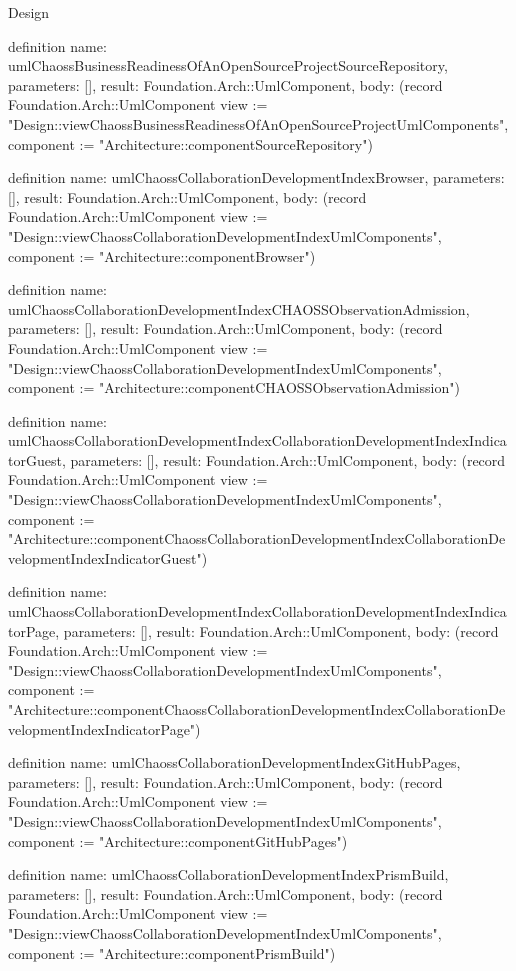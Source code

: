 \begin{lexlean}{Design}
\begin{semanticmodule}
definition{
  name: umlChaossBusinessReadinessOfAnOpenSourceProjectSourceRepository,
  parameters: [],
  result: Foundation.Arch::UmlComponent,
  body: (record Foundation.Arch::UmlComponent {view := "Design::viewChaossBusinessReadinessOfAnOpenSourceProjectUmlComponents", component := "Architecture::componentSourceRepository"})
}

definition{
  name: umlChaossCollaborationDevelopmentIndexBrowser,
  parameters: [],
  result: Foundation.Arch::UmlComponent,
  body: (record Foundation.Arch::UmlComponent {view := "Design::viewChaossCollaborationDevelopmentIndexUmlComponents", component := "Architecture::componentBrowser"})
}

definition{
  name: umlChaossCollaborationDevelopmentIndexCHAOSSObservationAdmission,
  parameters: [],
  result: Foundation.Arch::UmlComponent,
  body: (record Foundation.Arch::UmlComponent {view := "Design::viewChaossCollaborationDevelopmentIndexUmlComponents", component := "Architecture::componentCHAOSSObservationAdmission"})
}

definition{
  name: umlChaossCollaborationDevelopmentIndexCollaborationDevelopmentIndexIndicatorGuest,
  parameters: [],
  result: Foundation.Arch::UmlComponent,
  body: (record Foundation.Arch::UmlComponent {view := "Design::viewChaossCollaborationDevelopmentIndexUmlComponents", component := "Architecture::componentChaossCollaborationDevelopmentIndexCollaborationDevelopmentIndexIndicatorGuest"})
}

definition{
  name: umlChaossCollaborationDevelopmentIndexCollaborationDevelopmentIndexIndicatorPage,
  parameters: [],
  result: Foundation.Arch::UmlComponent,
  body: (record Foundation.Arch::UmlComponent {view := "Design::viewChaossCollaborationDevelopmentIndexUmlComponents", component := "Architecture::componentChaossCollaborationDevelopmentIndexCollaborationDevelopmentIndexIndicatorPage"})
}

definition{
  name: umlChaossCollaborationDevelopmentIndexGitHubPages,
  parameters: [],
  result: Foundation.Arch::UmlComponent,
  body: (record Foundation.Arch::UmlComponent {view := "Design::viewChaossCollaborationDevelopmentIndexUmlComponents", component := "Architecture::componentGitHubPages"})
}

definition{
  name: umlChaossCollaborationDevelopmentIndexPrismBuild,
  parameters: [],
  result: Foundation.Arch::UmlComponent,
  body: (record Foundation.Arch::UmlComponent {view := "Design::viewChaossCollaborationDevelopmentIndexUmlComponents", component := "Architecture::componentPrismBuild"})
}


\end{semanticmodule}
\end{lexlean}
